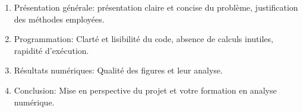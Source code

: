 \documentclass[a4paper, 12pt]{article}
\begin{document}
\begin{enumerate}
    \item Présentation générale: présentation claire et concise du problème, justification des méthodes employées.
    \item Programmation: Clarté et lisibilité du code, absence de calculs inutiles, rapidité d’exécution.
    \item Résultats numériques: Qualité des figures et leur analyse. 
    \item Conclusion: Mise en perspective du projet et votre formation en analyse numérique. 
\end{enumerate}
\end{document}
